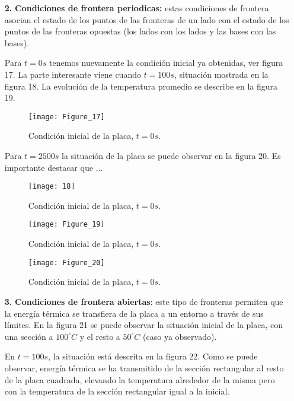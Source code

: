 \documentclass{article}
\begin{document}
\begin{itemize}
\item[\textbf{2.}] \textbf{Condiciones de frontera periodicas:} estas condiciones de frontera asocian el estado de los puntos de las fronteras de un lado con el estado de los puntos de las fronteras opuestas (los lados con los lados y las bases con las bases).

Para $t=0s$ tenemos nuevamente la condici\'on inicial ya obtenidas, ver figura 17. La parte interesante viene cuando $t=100 s$, situaci\'on mostrada en la figura 18. La evoluci\'on  de la temperatura promedio se describe en la figura 19.

\begin{figure}
\begin{center}
\texttt{[image: Figure\_17]}
\end{center}
\caption{Condici\'on inicial de la placa, $t = 0 s$.}
\end{figure}
Para $t = 2500 s$ la situaci\'on de la placa se puede observar en la figura 20. Es importante destacar que ...

\begin{figure}
\begin{center}
\texttt{[image: 18]}
\end{center}
\caption{Condici\'on inicial de la placa, $t = 0 s$.}
\end{figure}

\begin{figure}
\begin{center}
\texttt{[image: Figure\_19]}
\end{center}
\caption{Condici\'on inicial de la placa, $t = 0 s$.}
\end{figure}

\begin{figure}
\begin{center}
\texttt{[image: Figure\_20]}
\end{center}
\caption{Condici\'on inicial de la placa, $t = 0 s$.}
\end{figure}

\item[\textbf{3.}] \textbf{Condiciones de frontera abiertas}: este tipo de fronteras permiten que la energ\'ia t\'ermica se transfiera de la placa a un entorno a trav\'es de sus l\'imites. En la figura 21 se puede observar la situaci\'on inicial de la placa, con una secci\'on a $100^{\circ} C$ y el resto a $50^{\circ}C$ (caso ya observado).

En $t = 100 s$, la situaci\'on est\'a descrita en la figura 22. Como se puede observar,  energ\'ia t\'ermica se ha transmitido de la secci\'on rectangular al resto de la placa cuadrada, elevando la temperatura alrededor de la misma pero con la temperatura de la secci\'on rectangular igual a la inicial.


\end{itemize}
\end{document}

